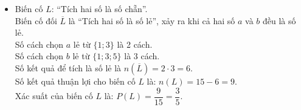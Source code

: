 \begin{bt}
{\begin{enumerate}[a)]
\begin{itemize}
        \begin{itemize}
            \item Với $a = 1$: $b \in \{1; 2; 3; 4\}$ (có 4 cặp: $(1; 1), (1; 2), (1; 3), (1; 4)$).
            \item Với $a = 2$: $b \in \{1; 2\}$ (có 2 cặp: $(2; 1), (2; 2)$).
            \item Với $a = 3$: $b \in \{1\}$ (có 1 cặp: $(3; 1)$).
        \end{itemize}
        Số kết quả thuận lợi là $n(M) = 4 + 2 + 1 = 7$.\\
        Xác suất của biến cố $M$ là:
        $P(M) = \dfrac{7}{15}$.
        \item Biến cố $L$: “Tích hai số là số chẵn”.\\
        Biến cố đối $\overline{L}$ là “Tích hai số là số lẻ”, xảy ra khi cả hai số $a$ và $b$ đều là số lẻ.\\
        Số cách chọn $a$ lẻ từ $\{1; 3\}$ là 2 cách.\\
        Số cách chọn $b$ lẻ từ $\{1; 3; 5\}$ là 3 cách.\\
        Số kết quả để tích là số lẻ là $n(\overline{L}) = 2 \cdot 3 = 6$.\\
        Số kết quả thuận lợi cho biến cố $L$ là:
        $n(L) = 15 - 6 = 9$.\\
        Xác suất của biến cố $L$ là:
        $P(L) = \dfrac{9}{15} = \dfrac{3}{5}$.
    \end{itemize}
\end{enumerate}
}
\end{bt}

